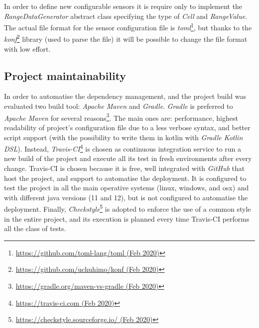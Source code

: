 % 
In order to define new configurable sensors it is require only to implement the \mbox{\textit{RangeDataGenerator}} abstract class specifying the type of \mbox{\textit{Cell}} and \mbox{\textit{RangeValue}}.
The actual file format for the sensor configuration file is \textit{toml}\footnote{\href{https://github.com/toml-lang/toml}{https://github.com/toml-lang/toml (Feb 2020)}}, but thanks to the \textit{konf}\footnote{\href{https://github.com/uchuhimo/konf}{https://github.com/uchuhimo/konf (Feb 2020)}} library (used to parse the file) it will be possible to change the file format with low effort.

\subsection*{Project maintainability}
In order to automatise the dependency management, and the project build was evaluated two build tool: \textit{Apache Maven} and \textit{Gradle}.
\textit{Gradle} is preferred to \textit{Apache Maven} for several reasons\footnote{\href{https://gradle.org/maven-vs-gradle/}{https://gradle.org/maven-vs-gradle (Feb 2020)}}. The main ones are: performance, highest readability of project's configuration file due to a less verbose syntax, and better script support (with the possibility to write them in kotlin with \textit{Gradle Kotlin DSL}).
Instead, \textit{Travis-CI}\footnote{\href{https://travis-ci.com/}{https://travis-ci.com (Feb 2020)}} is chosen as continuous integration service to run a new build of the project and execute all its test in fresh environments after every change.
Travis-CI is chosen because it is free, well integrated with \textit{GitHub} that host the project, and support to automatise the deployment.
It is configured to test the project in all the main operative systems (linux, windows, and osx) and with different java versions (11 and 12), but is not configured to automatise the deployment.
Finally, \textit{Checkstyle}\footnote{\href{https://checkstyle.sourceforge.io/}{https://checkstyle.sourceforge.io/ (Feb 2020)}} is adopted to enforce the use of a common style in the entire project, and its execution is planned every time Travis-CI performs all the class of tests. 

\clearpage
